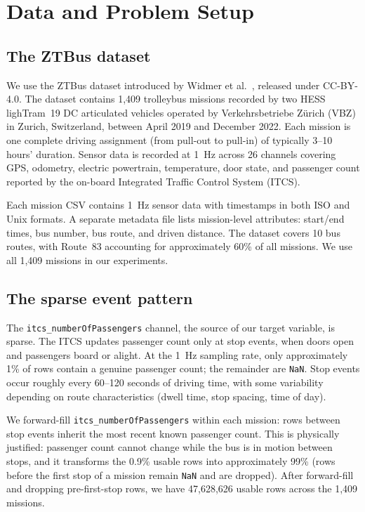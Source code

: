 \section{Data and Problem Setup}
\label{sec:data}

\subsection{The ZTBus dataset}

We use the ZTBus dataset introduced by Widmer et
al.~\cite{widmer2023ztbus}, released under CC-BY-4.0. The dataset contains
1,409 trolleybus missions recorded by two HESS lighTram~19 DC articulated
vehicles operated by Verkehrsbetriebe Z\"urich (VBZ) in Zurich,
Switzerland, between April 2019 and December 2022. Each mission is one
complete driving assignment (from pull-out to pull-in) of typically 3--10
hours' duration. Sensor data is recorded at 1~Hz across 26 channels
covering GPS, odometry, electric powertrain, temperature, door state, and
passenger count reported by the on-board Integrated Traffic Control System
(ITCS).

Each mission CSV contains 1~Hz sensor data with timestamps in both ISO and
Unix formats. A separate metadata file lists mission-level attributes:
start/end times, bus number, bus route, and driven distance. The dataset
covers 10 bus routes, with Route~83 accounting for approximately 60\% of
all missions. We use all 1,409 missions in our experiments.

\subsection{The sparse event pattern}

The \texttt{itcs\_numberOfPassengers} channel, the source of our target
variable, is sparse. The ITCS updates passenger count only at stop events,
when doors open and passengers board or alight. At the 1~Hz sampling rate,
only approximately 1\% of rows contain a genuine passenger count; the
remainder are \texttt{NaN}. Stop events occur roughly every 60--120 seconds
of driving time, with some variability depending on route characteristics
(dwell time, stop spacing, time of day).

We forward-fill \texttt{itcs\_numberOfPassengers} within each mission: rows
between stop events inherit the most recent known passenger count. This is
physically justified: passenger count cannot change while the bus is in
motion between stops, and it transforms the 0.9\% usable rows into
approximately 99\% (rows before the first stop of a mission remain
\texttt{NaN} and are dropped). After forward-fill and dropping pre-first-stop
rows, we have 47,628,626 usable rows across the 1,409 missions.

